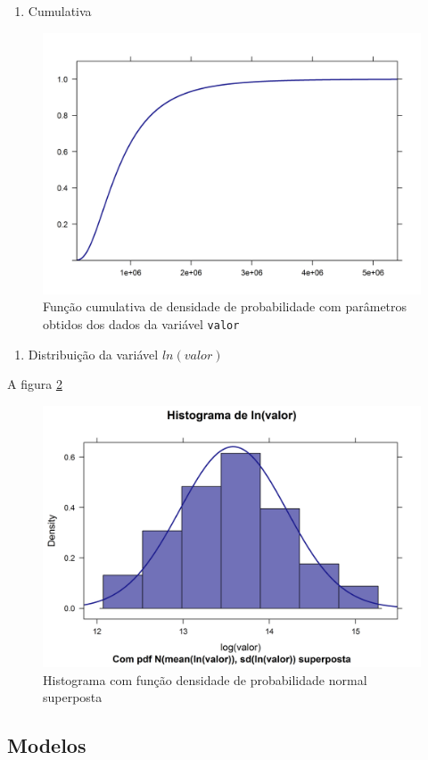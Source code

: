 \documentclass[a4paper]{article}
\providecommand{\tightlist}{%
  \setlength{\itemsep}{0pt}\setlength{\parskip}{0pt}}
\let\code=\texttt
\begin{document}
\begin{enumerate}
\def\labelenumi{\alph{enumi}.}
\setcounter{enumi}{2}
\tightlist
\item
  Cumulativa
\end{enumerate}

\begin{figure}[H]

{\centering \includegraphics[width=0.5\linewidth]{images/cdf-1} 

}

\caption{Função cumulativa de densidade de probabilidade com parâmetros obtidos dos dados da variável \code{valor}}\label{fig:cdf}
\end{figure}

\begin{enumerate}
\def\labelenumi{\alph{enumi}.}
\setcounter{enumi}{3}
\tightlist
\item
  Distribuição da variável \(ln(valor)\)
\end{enumerate}

A figura \ref{fig:hist_densidade2}

\begin{figure}[H]

{\centering \includegraphics[width=0.5\linewidth]{images/hist_densidade2-1} 

}

\caption{Histograma com função densidade de probabilidade normal superposta}\label{fig:hist_densidade2}
\end{figure}

\subsection{Modelos}\label{modelos}
\end{document}
